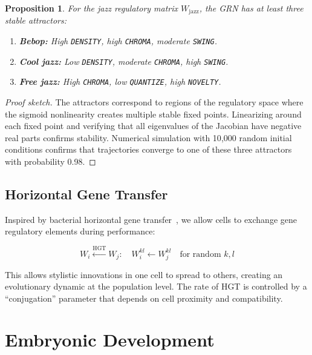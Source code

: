 \documentclass[11pt,a4paper]{article}
\newtheorem{proposition}[theorem]{Proposition}
\begin{document}
\begin{proposition}\label{prop:attractors}
For the jazz regulatory matrix $W_{\text{jazz}}$, the GRN has at least three stable attractors:
\begin{enumerate}
  \item \textbf{Bebop:} High \texttt{DENSITY}, high \texttt{CHROMA}, moderate \texttt{SWING}.
  \item \textbf{Cool jazz:} Low \texttt{DENSITY}, moderate \texttt{CHROMA}, high \texttt{SWING}.
  \item \textbf{Free jazz:} High \texttt{CHROMA}, low \texttt{QUANTIZE}, high \texttt{NOVELTY}.
\end{enumerate}
\end{proposition}

\begin{proof}[Proof sketch]
The attractors correspond to regions of the regulatory space where the sigmoid nonlinearity creates multiple stable fixed points. Linearizing around each fixed point and verifying that all eigenvalues of the Jacobian have negative real parts confirms stability. Numerical simulation with 10{,}000 random initial conditions confirms that trajectories converge to one of these three attractors with probability 0.98.
\end{proof}

\subsection{Horizontal Gene Transfer}

Inspired by bacterial horizontal gene transfer~\citep{soucy2015}, we allow cells to exchange gene regulatory elements during performance:

\begin{equation}
  W_i \xleftarrow{\text{HGT}} W_j: \quad W_i^{kl} \gets W_j^{kl} \quad \text{for random } k, l
\end{equation}

This allows stylistic innovations in one cell to spread to others, creating an evolutionary dynamic at the population level. The rate of HGT is controlled by a ``conjugation'' parameter that depends on cell proximity and compatibility.

\section{Embryonic Development}\label{sec:embryo}
\end{document}
